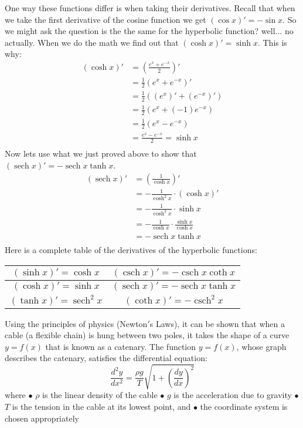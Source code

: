 \documentclass[12pt]{article}
\DeclareMathOperator{\sech}{sech}
\DeclareMathOperator{\csch}{csch}
\begin{document}
One way these functions differ is when taking their derivatives. Recall that when we take the first derivative of the cosine function we get $(\cos{x})' = -\sin{x}$. So we might ask the question is the the same for the hyperbolic function? well... no actually. When we do the math we find out that $(\cosh{x})' = \sinh{x}$. This is why:
\begin{align} \nonumber
(\cosh{x})' &= \left(\frac{e^x + e^{-x}}{2}\right)'\\ \nonumber
 &= \frac{1}{2}(e^x + e^{-x})'\\ \nonumber
 &= \frac{1}{2}\left((e^x)' + (e^{-x})'\right)\\ \nonumber
 &= \frac{1}{2}(e^x + (-1)e^{-x})\\ \nonumber
 &= \frac{1}{2}(e^x - e^{-x})\\ \nonumber
 &= \frac{e^x - e^{-x}}{2} = \sinh{x}\\ \nonumber
\end{align}
Now lets use what we just proved above to show that $(\sech{x})' = -\sech{x} \tanh{x}$.
\begin{align} \nonumber
(\sech{x})' &= \left(\frac{1}{\cosh{x}} \right)'\\ \nonumber
 &= -\frac{1}{\cosh^2{x}}\cdot(\cosh{x})'\\ \nonumber
 &= -\frac{1}{\cosh^2{x}}\cdot\sinh{x}\\ \nonumber
 &= -\frac{1}{\cosh{x}}\cdot\frac{\sinh{x}}{\cosh{x}}\\ \nonumber
 &= -\sech{x} \tanh{x}\\ \nonumber
\end{align}
Here is a complete table of the derivatives of the hyperbolic functions:
\begin{center}
\renewcommand{\arraystretch}{2}
\begin{tabular}{ |c|c| } 
 \hline
  $(\sinh{x})' = \cosh{x}$ & $(\csch{x})' = -\csch{x}\coth{x}$  \\ 
 \hline
  $(\cosh{x})' = \sinh{x}$ & $(\sech{x})' = -\sech{x}\tanh{x}$  \\ 
 \hline
  $(\tanh{x})' = \sech^2{x}$ & $(\coth{x})' = -\csch^2{x}$  \\ 
 \hline
\end{tabular}
\end{center}
\newpage
Using the principles of physics (Newton$'$s Laws), it can be shown that when a cable (a flexible chain) is hung between two poles, it takes the shape of a curve $y = f(x)$ that is known as a catenary. The function $y = f(x)$, whose graph describes the catenary, satisfies the diﬀerential equation:
\[\frac{d^2y}{dx^2} = \frac{\rho g}{T}\sqrt{1 + \left(\frac{dy}{dx}\right)^2}\]
where
\newline
$\bullet$ $\rho$ is the linear density of the cable
\newline
$\bullet$ $g$ is the acceleration due to gravity
\newline
$\bullet$ $T$ is the tension in the cable at its lowest point, and
\newline
$\bullet$ the coordinate system is chosen appropriately
\newline
\end{document}
